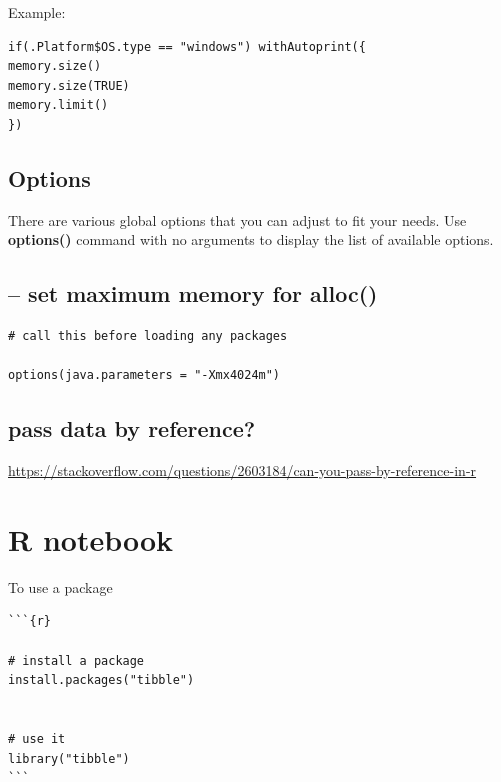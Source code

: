 Example:
\begin{verbatim}
if(.Platform$OS.type == "windows") withAutoprint({
memory.size()
memory.size(TRUE)
memory.limit()
})
\end{verbatim}

\subsection{Options}
\label{sec:options}

There are various global options that you can adjust to fit your
needs. Use {\bf options()} command with no arguments to display the
list of available options. 

\subsection{-- set maximum memory for alloc() }

\begin{verbatim}
# call this before loading any packages

options(java.parameters = "-Xmx4024m")
\end{verbatim}


\subsection{pass data by reference?}

\url{https://stackoverflow.com/questions/2603184/can-you-pass-by-reference-in-r}



\section{R notebook}


To use a package
\begin{verbatim}
```{r}

# install a package
install.packages("tibble")


# use it
library("tibble")
```
\end{verbatim}


